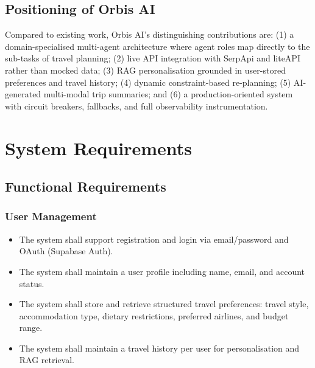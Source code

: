 \documentclass[12pt, a4paper]{article}
\begin{document}
\subsection{Positioning of Orbis AI}

Compared to existing work, Orbis AI's distinguishing contributions are: (1) a domain-specialised multi-agent architecture where agent roles map directly to the sub-tasks of travel planning; (2) live API integration with SerpApi and liteAPI rather than mocked data; (3) RAG personalisation grounded in user-stored preferences and travel history; (4) dynamic constraint-based re-planning; (5) AI-generated multi-modal trip summaries; and (6) a production-oriented system with circuit breakers, fallbacks, and full observability instrumentation.

\section{System Requirements}

\subsection{Functional Requirements}

\subsubsection{User Management}
\begin{itemize}[leftmargin=1.5cm, itemsep=0.3em]
  \item The system shall support registration and login via email/password and OAuth (Supabase Auth).
  \item The system shall maintain a user profile including name, email, and account status.
  \item The system shall store and retrieve structured travel preferences: travel style, accommodation type, dietary restrictions, preferred airlines, and budget range.
  \item The system shall maintain a travel history per user for personalisation and RAG retrieval.
\end{itemize}
\end{document}
